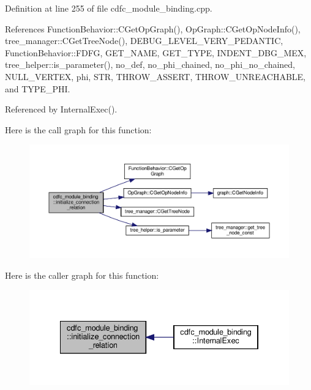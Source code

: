Definition at line 255 of file cdfc\+\_\+module\+\_\+binding.\+cpp.



References Function\+Behavior\+::\+C\+Get\+Op\+Graph(), Op\+Graph\+::\+C\+Get\+Op\+Node\+Info(), tree\+\_\+manager\+::\+C\+Get\+Tree\+Node(), D\+E\+B\+U\+G\+\_\+\+L\+E\+V\+E\+L\+\_\+\+V\+E\+R\+Y\+\_\+\+P\+E\+D\+A\+N\+T\+IC, Function\+Behavior\+::\+F\+D\+FG, G\+E\+T\+\_\+\+N\+A\+ME, G\+E\+T\+\_\+\+T\+Y\+PE, I\+N\+D\+E\+N\+T\+\_\+\+D\+B\+G\+\_\+\+M\+EX, tree\+\_\+helper\+::is\+\_\+parameter(), no\+\_\+def, no\+\_\+phi\+\_\+chained, no\+\_\+phi\+\_\+no\+\_\+chained, N\+U\+L\+L\+\_\+\+V\+E\+R\+T\+EX, phi, S\+TR, T\+H\+R\+O\+W\+\_\+\+A\+S\+S\+E\+RT, T\+H\+R\+O\+W\+\_\+\+U\+N\+R\+E\+A\+C\+H\+A\+B\+LE, and T\+Y\+P\+E\+\_\+\+P\+HI.



Referenced by Internal\+Exec().

Here is the call graph for this function\+:
\nopagebreak
\begin{figure}[H]
\begin{center}
\leavevmode
\includegraphics[width=350pt]{d9/dc4/classcdfc__module__binding_a73c31494075a9cc9bfddb9e83bfd2dca_cgraph}
\end{center}
\end{figure}
Here is the caller graph for this function\+:
\nopagebreak
\begin{figure}[H]
\begin{center}
\leavevmode
\includegraphics[width=334pt]{d9/dc4/classcdfc__module__binding_a73c31494075a9cc9bfddb9e83bfd2dca_icgraph}
\end{center}
\end{figure}
\mbox{\label{classcdfc__module__binding_a4cb7a3249964fc7ebfb3cf33361d2cb2}} 
